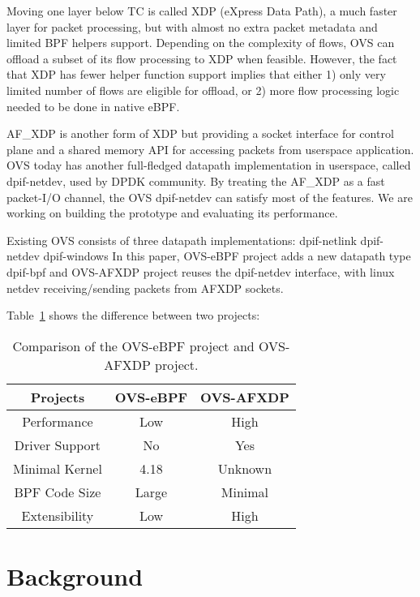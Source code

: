 \documentclass[10pt]{sigplanconf}
\begin{document}
Moving one layer below TC is called XDP (eXpress Data Path), a much faster layer for packet
processing, but with almost no extra packet metadata and limited BPF helpers support.
Depending on the complexity of flows, OVS can offload a subset of its flow processing to XDP
when feasible. However, the fact that XDP has fewer helper function support implies that either
1) only very limited number of flows are eligible for offload, or 2) more flow processing logic
needed to be done in native eBPF.
 
AF\_XDP is another form of XDP but providing a socket interface for control plane and a shared
memory API for accessing packets from userspace application. OVS today has another full-fledged
datapath implementation in userspace, called dpif-netdev, used by DPDK community.
By treating the AF\_XDP as a fast packet-I/O channel, the OVS dpif-netdev can satisfy most of the
features. We are working on building the prototype and evaluating its performance.


Existing OVS consists of three datapath implementations:
dpif-netlink
dpif-netdev
dpif-windows
In this paper, OVS-eBPF project adds a new datapath type
dpif-bpf
and OVS-AFXDP project reuses the dpif-netdev interface, with
linux netdev receiving/sending packets from AFXDP sockets.  

Table~\ref{compare} shows the difference between two projects:
\begin{table}
\centering
\scriptsize
\begin{tabular}{|c | c | c|}
\hline
 {\bf Projects} & {\bf OVS-eBPF } & {\bf OVS-AFXDP} \\ \hline\hline
  Performance & Low & High \\ \hline
  Driver Support & No & Yes \\ \hline
  Minimal Kernel & 4.18 & Unknown \\ \hline
  BPF Code Size & Large & Minimal \\ \hline
  Extensibility & Low & High \\ \hline
  \end{tabular}
\caption{\footnotesize
Comparison of the OVS-eBPF project and OVS-AFXDP project.
}
\label{compare}
\end{table}

\section{Background}
\end{document}
